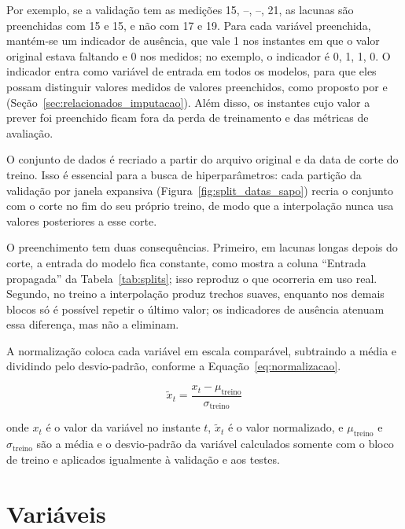 Por exemplo, se a validação tem as medições 15, --, --, 21, as lacunas são preenchidas com 15 e 15, e não com 17 e 19. Para cada variável preenchida, mantém-se um indicador de ausência, que vale 1 nos instantes em que o valor original estava faltando e 0 nos medidos; no exemplo, o indicador é 0, 1, 1, 0. O indicador entra como variável de entrada em todos os modelos, para que eles possam distinguir valores medidos de valores preenchidos, como proposto por  e  (Seção~\ref{sec:relacionados_imputacao}). Além disso, os instantes cujo valor a prever foi preenchido ficam fora da perda de treinamento e das métricas de avaliação.

O conjunto de dados é recriado a partir do arquivo original e da data de corte do treino. Isso é essencial para a busca de hiperparâmetros: cada partição da validação por janela expansiva (Figura~\ref{fig:split_datas_sapo}) recria o conjunto com o corte no fim do seu próprio treino, de modo que a interpolação nunca usa valores posteriores a esse corte.

O preenchimento tem duas consequências. Primeiro, em lacunas longas depois do corte, a entrada do modelo fica constante, como mostra a coluna ``Entrada propagada'' da Tabela~\ref{tab:splits}; isso reproduz o que ocorreria em uso real. Segundo, no treino a interpolação produz trechos suaves, enquanto nos demais blocos só é possível repetir o último valor; os indicadores de ausência atenuam essa diferença, mas não a eliminam.

A normalização coloca cada variável em escala comparável, subtraindo a média e dividindo pelo desvio-padrão, conforme a Equação~\ref{eq:normalizacao}.

\begin{equation}
    \tilde{x}_{t}=\frac{x_{t}-\mu_{\text{treino}}}{\sigma_{\text{treino}}}
    \label{eq:normalizacao}
\end{equation}

\noindent onde \(x_t\) é o valor da variável no instante \(t\), \(\tilde{x}_t\) é o valor normalizado, e \(\mu_{\text{treino}}\) e \(\sigma_{\text{treino}}\) são a média e o desvio-padrão da variável calculados somente com o bloco de treino e aplicados igualmente à validação e aos testes.

\section{Variáveis}
\label{sec:variaveis}


